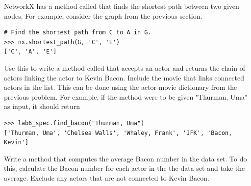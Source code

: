 \begin{problem}
NetworkX has a method called  that finds the shortest path between two given nodes.
For example, consider the graph  from the previous section.
\begin{lstlisting}
# Find the shortest path from C to A in G.
>>> nx.shortest_path(G, 'C', 'E')
['C', 'A', 'E']
\end{lstlisting}
Use this to write a method called  that accepts an actor and returns the chain of actors linking the actor to Kevin Bacon.
Include the movie that links connected actors in the list.
This can be done using the actor-movie dictionary from the previous problem.
For example, if the method were to be given "Thurman, Uma" as input, it should return
\begin{lstlisting}
>>> lab6_spec.find_bacon("Thurman, Uma")
['Thurman, Uma', 'Chelsea Walls', 'Whaley, Frank', 'JFK', 'Bacon, Kevin']  
\end{lstlisting}
\end{problem}

\begin{problem}
Write a method that computes the average Bacon number in the  data set.
To do this, calculate the Bacon number for each actor in the the data set and take the average.
Exclude any actors that are not connected to Kevin Bacon.
\end{problem}

